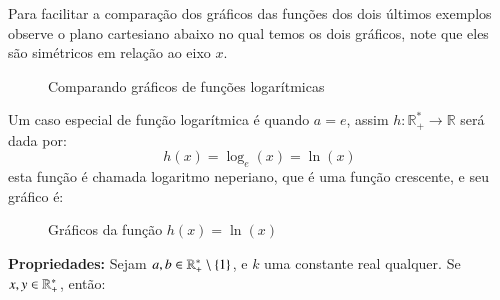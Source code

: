  Para facilitar a comparação dos gráficos das funções dos dois últimos exemplos observe o plano cartesiano abaixo no qual temos os dois gráficos, note que eles são simétricos em relação ao eixo $x$.
 
   \begin{figure}[H]
 \centering
    \caption{Comparando gráficos de funções logarítmicas}
  \end{figure}


  \begin{exem} \label{ex:log-e}
   Um caso especial de função logarítmica é quando $a= e$, assim $h: \mathbb{R_{+}^{*}} \rightarrow \mathbb{R} $ será dada por:
    \[h(x) = \log_{e}(x)= \ln(x)\]
  esta função é chamada logaritmo neperiano, que é uma função crescente, e seu gráfico é:

   \begin{figure}[H]
    \centering
    \caption{Gráficos da função $h(x)= \ln(x)$}
   \end{figure}
   
 \end{exem}

  \textbf{Propriedades:} Sejam $a, b \in \mathbb{R}_{+}^{*} \setminus \{1\}$, e $k$ uma constante real qualquer. Se $x, y \in \mathbb{R}_{+}^{*}$, então:
  
